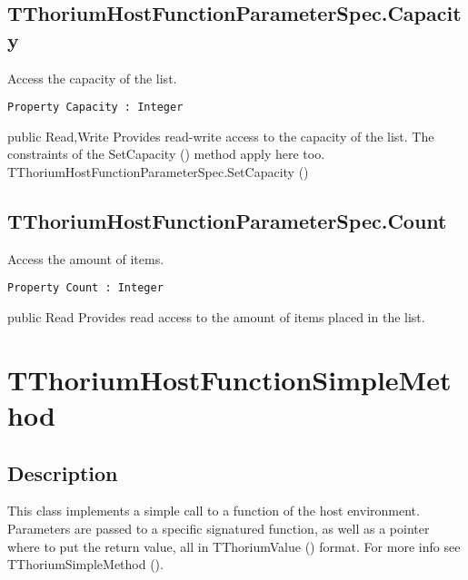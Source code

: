 \subsection{TThoriumHostFunctionParameterSpec.Capacity}
\label{thoriumcorepkg:thorium:tthoriumhostfunctionparameterspec:capacity}
\begin{FPCList}
\Synopsis
Access the capacity of the list.\Declaration 

\begin{verbatim}
Property Capacity : Integer
\end{verbatim}
\Visibility
public
\Access
Read,Write
\Description
Provides read-write access to the capacity of the list. The constraints of the SetCapacity (\pageref{thoriumcorepkg:thorium:tthoriumhostfunctionparameterspec:setcapacity}) method apply here too.\SeeAlso
TThoriumHostFunctionParameterSpec.SetCapacity (\pageref{thoriumcorepkg:thorium:tthoriumhostfunctionparameterspec:setcapacity})\end{FPCList}
\subsection{TThoriumHostFunctionParameterSpec.Count}
\label{thoriumcorepkg:thorium:tthoriumhostfunctionparameterspec:count}
\begin{FPCList}
\Synopsis
Access the amount of items.\Declaration 

\begin{verbatim}
Property Count : Integer
\end{verbatim}
\Visibility
public
\Access
Read
\Description
Provides read access to the amount of items placed in the list.\end{FPCList}
\section{TThoriumHostFunctionSimpleMethod}
\label{thoriumcorepkg:thorium:tthoriumhostfunctionsimplemethod}
\subsection{Description}
This class implements a simple call to a function of the host environment. Parameters are passed to a specific signatured function, as well as a pointer where to put the return value, all in TThoriumValue (\pageref{thoriumcorepkg:thorium:tthoriumvalue}) format. For more info see TThoriumSimpleMethod (\pageref{thoriumcorepkg:thorium:tthoriumsimplemethod}).%
